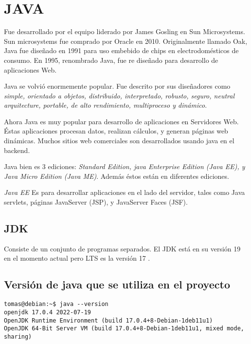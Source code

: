 \chapter*{JAVA}
Fue desarrollado por el equipo liderado por James Gosling en Sun Microsystems. Sun microsystems fue comprado por Oracle en 2010. Originalmente llamado Oak, Java fue diseñado en 1991 para uso embebido de chips en electrodomésticos de consumo. En 1995, renombrado Java, fue re diseñado para desarrollo de aplicaciones Web. 

Java se volvió enormemente popular. Fue descrito por sus diseñadores como \textit{ simple, orientado a objetos, distribuido, interpretado, robusto, seguro, neutral arquitecture, portable, de alto rendimiento, multiproceso y dinámico}.

Ahora Java es muy popular para desarrollo de aplicaciones en Servidores Web. Éstas aplicaciones procesan datos, realizan cálculos, y generan páginas web dinámicas. Muchos sitios web comerciales son desarrollados usando java en el backend. 

Java bien es 3 ediciones: \textit{Standard Edition, java Enterprise Edition (Java EE), y Java Micro Edition (Java ME)}. Además éstos están en diferentes ediciones.

\textit{ Java EE} Es para desarrollar aplicaciones en el lado del servidor, tales como Java servlets, páginas JavaServer (JSP), y JavaServer Faces (JSF).

\section{JDK}
Consiste de un conjunto de programas separados. El JDK está en su versión 19 en el momento actual pero LTS es la versión 17 \cite{historia}. 

\section{Versión de java que se utiliza en el proyecto}
\begin{verbatim}
tomas@debian:~$ java --version
openjdk 17.0.4 2022-07-19
OpenJDK Runtime Environment (build 17.0.4+8-Debian-1deb11u1)
OpenJDK 64-Bit Server VM (build 17.0.4+8-Debian-1deb11u1, mixed mode, sharing)
\end{verbatim}







